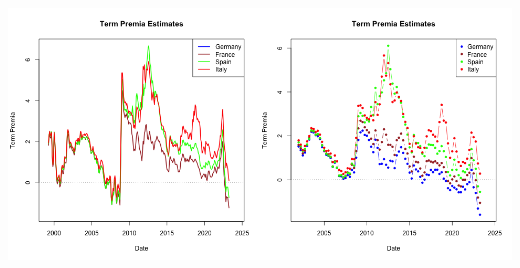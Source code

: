 \documentclass[
]{article}
\begin{document}
\includegraphics[width=0.5\textwidth,height=\textheight]{Plots/Historical/Model Term Premia estimates.png}\includegraphics[width=0.5\textwidth,height=\textheight]{Plots/Historical/Consensus Term Premia estimates.png}
\end{document}
